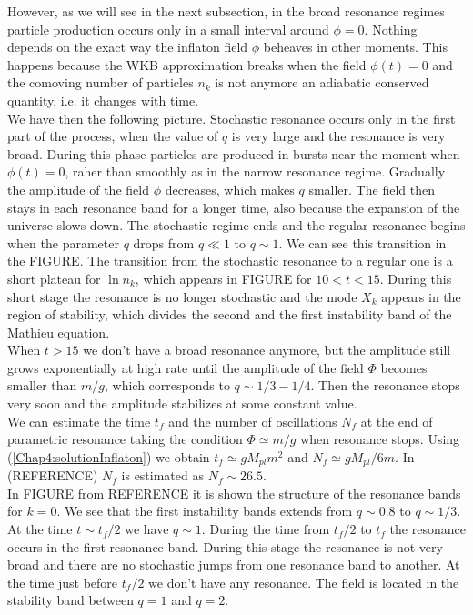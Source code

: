 \documentclass[11pt,a4paper,twoside]{book}
\begin{document}
However, as we will see in the next subsection, in the broad resonance regimes particle production occurs only in a small interval around $ \phi=0 $. Nothing depends on the exact way the inflaton field $\phi$ beheaves in other moments. This happens because the WKB approximation breaks when the field $ \phi(t)=0 $ and the comoving number of particles $ n_{k} $ is not anymore an adiabatic conserved quantity, i.e. it changes with time. \\
We have then the following picture. Stochastic resonance occurs only in the first part of the process, when the value of  $ q $ is very large and the resonance is very broad.  During this phase particles are produced in bursts near the moment when $ \phi(t)=0 $, raher than smoothly as in the narrow resonance regime. Gradually the amplitude of the field $\phi$ decreases, which makes $ q $ smaller. The field then stays in each resonance band for a longer time, also because the expansion of the universe slows down. The stochastic regime ends and the regular resonance begins when the parameter $ q $ drops from $ q \ll 1 $ to $ q \sim 1 $. We can see this transition in the FIGURE. The transition from the stochastic resonance to a regular one is a short plateau for $ \ln n_{k} $, which appears in FIGURE for $ 10<t <15 $. During this short stage the resonance is no longer stochastic and the mode $ X_{k} $ appears in the region of stability, which divides the second and the first instability band of the Mathieu equation.\\
When $ t>15 $ we don't have a broad resonance anymore, but the amplitude still grows exponentially at high rate until the amplitude of the field $ \Phi $ becomes smaller than $ m/g $, which corresponds to $ q \sim 1/3-1/4 $. Then the resonance stops very soon and the amplitude stabilizes at some constant value.\\
We can estimate the time $ t_{f} $ and the number of oscillations $ N_{f} $ at the end of parametric resonance taking the condition $\Phi \simeq m/g$ when resonance stops. Using (\ref{Chap4:solutionInflaton}) we obtain $ t_{f}\simeq gM_{pl}m^{2}$ and $ N_{f}\simeq gM_{pl}/6m $. In (REFERENCE) $ N_{f} $ is estimated as $ N_{f} \sim 26.5 $.\\
In FIGURE from REFERENCE it is shown the structure of the resonance bands for $ k=0 $. We see that the first instability bands extends from $ q\sim 0.8 $ to $ q\sim 1/3 $.\\
At the time $ t\sim t_{f}/2 $ we have $ q \sim 1 $. During the time from $ t_{f}/2 $ to $ t_{f} $ the resonance occurs in the first resonance band. During this stage the resonance is not very broad and there are no stochastic jumps from one resonance band to another. At the time just before $ t_{f}/2 $ we don't have any resonance. The field is located in the stability band between $ q=1 $ and $ q=2 $.\\
\end{document}

